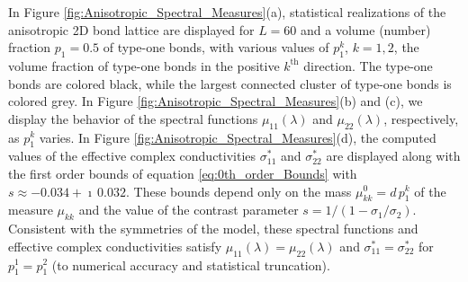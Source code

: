 \documentclass{cmslatex}
\begin{document}
In Figure \ref{fig:Anisotropic_Spectral_Measures}(a), statistical  
realizations of the anisotropic 2D bond lattice are displayed for
$L=60$ and a volume (number) fraction $p_1=0.5$ of type-one bonds,
with various values of $p_1^k$, $k=1,2$, the volume fraction of
type-one bonds in the positive $k^{\text{th}}$ direction. The type-one
bonds are colored black, while the largest connected cluster of
type-one bonds is colored grey. In Figure
\ref{fig:Anisotropic_Spectral_Measures}(b) and (c), we display the
behavior of the spectral functions $\mu_{11}(\lambda)$ and $\mu_{22}(\lambda)$,
respectively, as $p_1^k$ varies. In Figure
\ref{fig:Anisotropic_Spectral_Measures}(d), the computed values of the
effective complex conductivities $\sigma^*_{11}$ and $\sigma^*_{22}$
are displayed along with the first order bounds of equation
\eqref{eq:0th_order_Bounds} with $s\approx-0.034+\imath\,0.032$. These
bounds depend only on the mass $\mu^0_{kk}=d\,p_1^k$ of the measure
$\mu_{kk}$ and the value of the contrast parameter
$s=1/(1-\sigma_1/\sigma_2)$. Consistent with the symmetries of the
model, these spectral functions and effective complex conductivities 
satisfy $\mu_{11}(\lambda)=\mu_{22}(\lambda)$ and
$\sigma^*_{11}=\sigma^*_{22}$ for $p_1^1=p_1^2$ (to numerical accuracy
and statistical truncation). 
\end{document}
